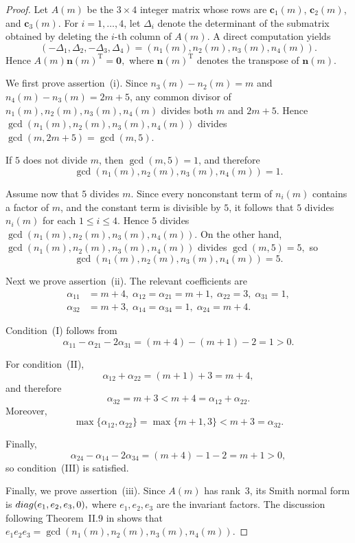\documentclass[10pt,a4paper]{amsart}
\begin{document}
\begin{proof}
Let $A(m)$ be the $3\times4$ integer matrix whose rows are
$\mathbf c_1(m)$, $\mathbf c_2(m)$, and $\mathbf c_3(m)$.
For $i=1,\ldots,4$, let $\Delta_i$ denote the determinant of the
submatrix obtained by deleting the $i$-th column of $A(m)$.
A direct computation yields
\[
(-\Delta_1,\Delta_2,-\Delta_3,\Delta_4)
=
(n_1(m),n_2(m),n_3(m),n_4(m)).
\]
Hence
$
A(m)\mathbf n(m)^{\mathrm T}=\mathbf 0,$ where $\mathbf n(m)^{\mathrm T}$ denotes the transpose of
$\mathbf n(m)$.

We first prove assertion~\textup{(i)}.
Since $n_3(m)-n_2(m)=m$ and $n_4(m)-n_3(m)=2m+5$,
any common divisor of
$n_1(m),n_2(m),n_3(m),n_4(m)$
divides both $m$ and $2m+5$.
Hence
$
\gcd(n_1(m),n_2(m),n_3(m),n_4(m))$
divides $\gcd(m,2m+5)
=
\gcd(m,5).$

If $5$ does not divide $m$, then $\gcd(m,5)=1$, and therefore
\[
\gcd(n_1(m),n_2(m),n_3(m),n_4(m))=1.
\]

Assume now that $5$ divides $m$. Since every nonconstant term of $n_i(m)$ contains a factor of $m$, and the constant term is divisible by $5$, it follows that $5$ divides $n_{i}(m)$ for each $1 \leq i \leq 4$.
Hence $5$ divides
$\gcd(n_1(m),n_2(m),n_3(m),n_4(m))$.
On the other hand,
$
\gcd(n_1(m),n_2(m),n_3(m),n_4(m))$ divides
$\gcd(m,5)=5,$ so
\[
\gcd(n_1(m),n_2(m),n_3(m),n_4(m))=5.
\]

Next we prove assertion~\textup{(ii)}.
The relevant coefficients are
\[
\begin{aligned}
\alpha_{11}&=m+4,\;
\alpha_{12}=\alpha_{21}=m+1,\;
\alpha_{22}=3,\;
\alpha_{31}=1,\\
\alpha_{32}&=m+3,\;
\alpha_{14}=\alpha_{34}=1,\;
\alpha_{24}=m+4.
\end{aligned}
\]

Condition~\textup{(I)} follows from
\[
\alpha_{11}-\alpha_{21}-2\alpha_{31}
=(m+4)-(m+1)-2=1>0.
\]

For condition~\textup{(II)},
\[
\alpha_{12}+\alpha_{22}
=(m+1)+3=m+4,
\]
and therefore
\[
\alpha_{32}=m+3<m+4=\alpha_{12}+\alpha_{22}.
\]
Moreover,
\[
\max\{\alpha_{12},\alpha_{22}\}
=\max\{m+1,3\}
<m+3=\alpha_{32}.
\]

Finally,
\[
\alpha_{24}-\alpha_{14}-2\alpha_{34}
=(m+4)-1-2=m+1>0,
\]
so condition~\textup{(III)} is satisfied.

Finally, we prove assertion~\textup{(iii)}.
Since $A(m)$ has rank~$3$, its Smith normal form is
${\rm diag}(e_1,e_2,e_3,0),$ where $e_1,e_2,e_3$ are the invariant factors.
The discussion following Theorem~II.9 in
\cite{Newman} shows that
$
e_1e_2e_3
=
\gcd(n_1(m),n_2(m),n_3(m),n_4(m)).$


\end{proof}
\end{document}
